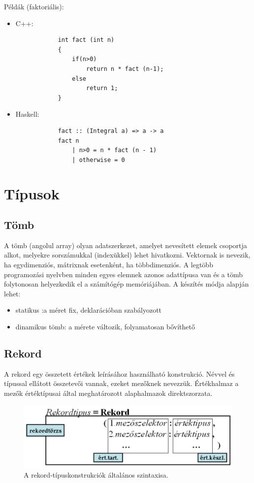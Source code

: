 \documentclass[12pt,margin=0px]{article}
\begin{document}
	\noindent Példák (faktoriális):
	
	\begin{itemize}
		\item	C++:
{\small
		\begin{verbatim}
			int fact (int n)
			{
			    if(n>0)
			        return n * fact (n-1);
			    else
			        return 1;
			}
		\end{verbatim}
}		
		\item	Haskell:
{\small
		\begin{verbatim}
			fact :: (Integral a) => a -> a
			fact n
			    | n>0 = n * fact (n - 1)
			    | otherwise = 0
		\end{verbatim}
}	
	\end{itemize}
	
	\section{Típusok}
	
	\subsection{Tömb}
	
	A tömb (angolul array) olyan adatszerkezet, amelyet nevesített elemek csoportja alkot, melyekre sorszámukkal (indexükkel) lehet hivatkozni. Vektornak is nevezik, ha egydimenziós, mátrixnak esetenként, ha többdimenziós. A legtöbb programozási nyelvben minden egyes elemnek azonos adattípusa van és a tömb folytonosan helyezkedik el a számítógép memóriájában. A készítés módja alapján lehet:
	
	\begin{itemize}
		\item	statikus :a méret fix, deklarációban szabályozott
		\item	dinamikus tömb: a mérete változik, folyamatosan bővíthető
	\end{itemize}

	\subsection{Rekord}
	
	A rekord egy összetett értékek leírásához használható konstrukció. Névvel és típussal ellátott összetevői vannak, ezeket mezőknek nevezzük.
	Értékhalmaz a mezők értéktípusai által meghatározott alaphalmazok direktszorzata.
	
	\begin{figure}[H]
		\centering
		\includegraphics[width=0.7\linewidth]{img/rekord}
		\caption{A rekord-típuskonstrukciók általános szintaxisa.}
		\label{fig:rekord}
	\end{figure}
	
\end{document}
